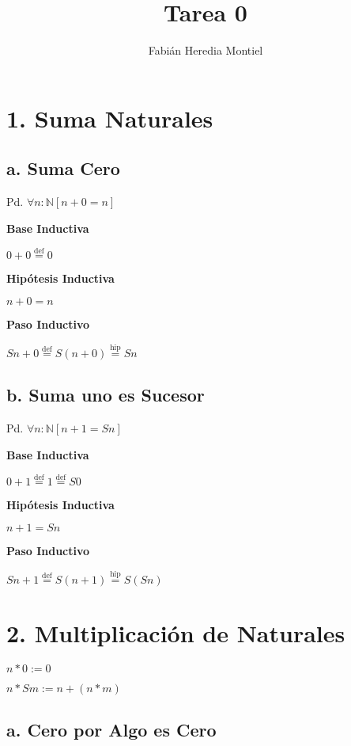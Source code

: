 \documentclass[spanish,]{article}
\title{Tarea 0}
\author{Fabián Heredia Montiel}
\date{}
\begin{document}
\maketitle

\hypertarget{suma-naturales}{%
\section{1. Suma Naturales}\label{suma-naturales}}

\hypertarget{a.-suma-cero}{%
\subsection{a. Suma Cero}\label{a.-suma-cero}}

Pd. \(\forall n: \mathbb{N} [n + 0 = n]\)

\textbf{Base Inductiva}

\(0 + 0 \overset{\text{def}}=0\)

\textbf{Hipótesis Inductiva}

\(n + 0 = n\)

\textbf{Paso Inductivo}

\(Sn + 0 \overset{\text{def}}=S(n + 0) \overset{\text{hip}}=Sn\)

\hypertarget{b.-suma-uno-es-sucesor}{%
\subsection{b. Suma uno es Sucesor}\label{b.-suma-uno-es-sucesor}}

Pd. \(\forall n: \mathbb{N} [n + 1 = Sn]\)

\textbf{Base Inductiva}

\(0 + 1 \overset{\text{def}}=1 \overset{\text{def}}=S 0\)

\textbf{Hipótesis Inductiva}

\(n + 1 = Sn\)

\textbf{Paso Inductivo}

\(Sn + 1 \overset{\text{def}}=S(n + 1) \overset{\text{hip}}=S(Sn)\)

\hypertarget{multiplicaciuxf3n-de-naturales}{%
\section{2. Multiplicación de
Naturales}\label{multiplicaciuxf3n-de-naturales}}

\(n*0 := 0\)

\(n*Sm := n + (n*m)\)

\hypertarget{a.-cero-por-algo-es-cero}{%
\subsection{a. Cero por Algo es Cero}\label{a.-cero-por-algo-es-cero}}
\end{document}
